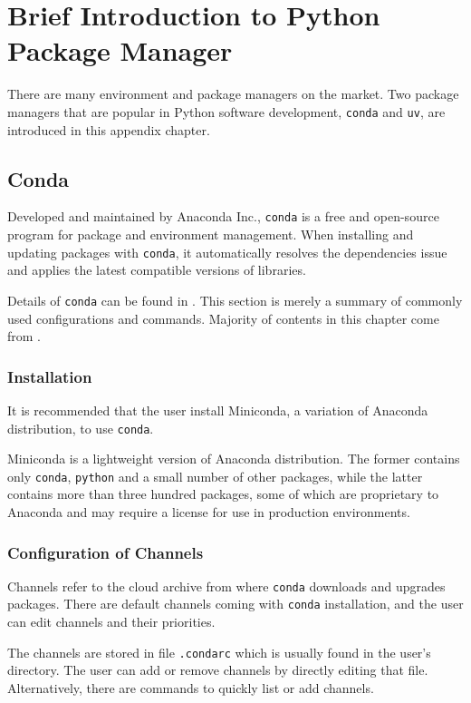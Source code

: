 \chapter{Brief Introduction to Python Package Manager}

There are many environment and package managers on the market. Two package managers that are popular in Python software development, \verb|conda| and \verb|uv|, are introduced in this appendix chapter.

\section{Conda}

Developed and maintained by Anaconda Inc., \verb|conda| is a free and open-source program for package and environment management. When installing and updating packages with \verb|conda|, it automatically resolves the dependencies issue and applies the latest compatible versions of libraries.

Details of \verb|conda| can be found in \cite{conda2025}. This section is merely a summary of commonly used configurations and commands. Majority of contents in this chapter come from \cite{conda2025cheatsheet}.

\subsection{Installation}

It is recommended that the user install Miniconda, a variation of Anaconda distribution, to use \verb|conda|.

Miniconda is a lightweight version of Anaconda distribution. The former contains only \verb|conda|, \verb|python| and a small number of other packages, while the latter contains more than three hundred packages, some of which are proprietary to Anaconda and may require a license for use in production environments.

\subsection{Configuration of Channels}

Channels refer to the cloud archive from where \verb|conda| downloads and upgrades packages. There are default channels coming with \verb|conda| installation, and the user can edit channels and their priorities.

The channels are stored in file \verb|.condarc| which is usually found in the user's directory. The user can add or remove channels by directly editing that file. Alternatively, there are commands to quickly list or add channels. 

